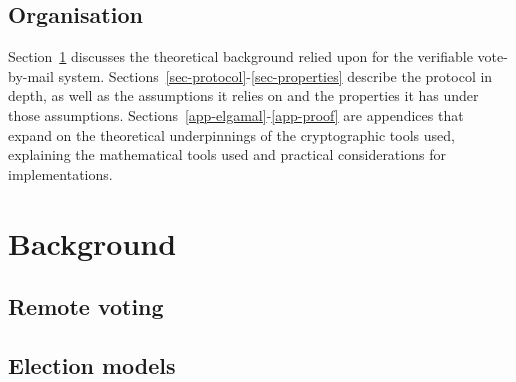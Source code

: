 \documentclass[11pt,twoside,a4paper]{article}
\theoremstyle{definition}
\begin{document}
\subsection{Organisation}
Section~\ref{sec-background} discusses the theoretical background relied upon for the verifiable vote-by-mail system. Sections~\ref{sec-protocol}-\ref{sec-properties} describe the protocol in depth, as well as the assumptions it relies on and the properties it has under those assumptions. Sections~\ref{app-elgamal}-\ref{app-proof}  are appendices that expand on the theoretical underpinnings of the cryptographic tools used, explaining the mathematical tools used and practical considerations for implementations.
\section{Background}\label{sec-background}
\subsection{Remote voting}
\subsection{Election models}
\end{document}
